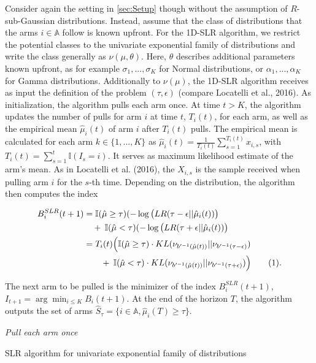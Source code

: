 \documentclass[11pt,]{article}
\newcommand*{\Alignyesnumber}{\refstepcounter{equation}\tag{\theequation}}%
\begin{document}
Consider again the setting in \autoref{sec:Setup} though without the
assumption of \(R\)-sub-Gaussian distributions. Instead, assume that the
class of distributions that the arms \(i \in \mathbb{A}\) follow is
known upfront. For the 1D-SLR algorithm, we restrict the potential
classes to the univariate exponential family of distributions and write
the class generally as \(\nu(\mu, \theta)\). Here, \(\theta\) describes
additional parameters known upfront, as for example
\(\sigma_1, ..., \sigma_K\) for Normal distributions, or
\(\alpha_1, ..., \alpha_K\) for Gamma distributions. Additionally to
\(\nu(\mu)\), the 1D-SLR algorithm receives as input the definition of
the problem \((\tau, \epsilon)\) (compare Locatelli et al., 2016). As
initialization, the algorithm pulls each arm once. At time \(t>K\), the
algorithm updates the number of pulls for arm \(i\) at time \(t\),
\(T_i(t)\), for each arm, as well as the empirical mean
\(\hat{\mu}_i(t)\) of arm \(i\) after \(T_i(t)\) pulls. The empirical
mean is calculated for each arm \(k\in \{1,...,K\}\) as
\(\hat{\mu}_i(t) = \frac{1}{T_i(t)}\sum_{s=1}^{T_i(t)} x_{i,s}\), with
\(T_i(t) = \sum_{s=1}^{t}\mathbb{I}(I_s = i)\). It serves as maximum
likelihood estimate of the arm's mean. As in Locatelli et al. (2016),
the \(X_{i,s}\) is the sample received when pulling arm \(i\) for the
\(s\)-th time. Depending on the distribution, the algorithm then
computes the index

\begin{align*}
B_i^{SLR}(t+1) & = \mathbb{I}(\hat{\mu}\geq \tau)(-\log\big(LR(\tau-\epsilon||\hat{\mu}_i(t))\big) \\
& \quad +\: \mathbb{I}(\hat{\mu} <\tau)(-\log\big(LR(\tau+\epsilon||\hat{\mu}_i(t))\big) \\
& = T_i(t) \Big( \mathbb{I}(\hat{\mu}\geq \tau)\cdot KL(\nu_{b'^{-1}(\hat{\mu}(t))}||\nu_{b'^{-1}(\tau-\epsilon)}) \\
& \quad \quad +\: \mathbb{I}(\hat{\mu} < \tau)\cdot KL(\nu_{b'^{-1}(\hat{\mu}(t))}||\nu_{b'^{-1}(\tau+\epsilon)}) \Big) \Alignyesnumber\label{eqn:SLRIndex}.
\end{align*}

The next arm to be pulled is the minimizer of the index
\(B_i^{SLR}(t+1)\), \(I_{t+1} = \arg \min_{i\leq K} B_i(t+1)\). At the
end of the horizon \(T\), the algorithm outputs the set of arms
\(\hat{S}_\tau = \{i \in \mathbb{A}, \hat{\mu}_i(T) \geq \tau\}\).

\IncMargin{1em}

\begin{algorithm}
\BlankLine
\emph{Pull each arm once}\;
\caption{SLR algorithm for univariate exponential family of distributions}\label{algo_slr_1d}
\end{algorithm}
\end{document}
